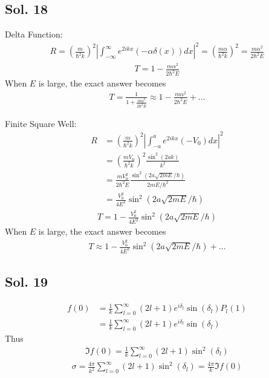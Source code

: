 \subsection*{Sol. 18}
Delta Function:
\begin{align*}
    R =
    \left(\frac{m}{\hbar^2k}\right)^2
    \left|
    \int_{-\infty}^\infty e^{2ikx}(-\alpha\delta(x))dx
    \right|^2 = \left(\frac{m\alpha}{\hbar^2k}\right)^2
    =\frac{m\alpha^2}{2\hbar^2 E}
\end{align*}
\begin{align*}
    T = 1-\frac{m\alpha^2}{2\hbar^2 E}
\end{align*}
When $E$ is large, the exact answer becomes
\begin{align*}
    T = \frac{1}{1+\frac{m\alpha^2}{2\hbar^2 E}}
    \approx 1 - \frac{m\alpha^2}{2\hbar^2 E}+\dots
\end{align*}


Finite Square Well:
\begin{align*}
    R & =
    \left(\frac{m}{\hbar^2k}\right)^2
    \left|
    \int_{-a}^a e^{2ikx}(-V_0)dx
    \right|^2 \\
      & =
    \left(\frac{m V_0}{\hbar^2k}\right)^2\frac{\sin^2(2ak)}{k^2} \\
      & =
    \frac{m V_0^2}{2\hbar^2 E}\frac{\sin^2(2a\sqrt{2mE}/\hbar)}{2mE/\hbar^2} \\
      & =
    \frac{V_0^2}{4 E^2}\sin^2(2a\sqrt{2mE}/\hbar)
\end{align*}
\begin{align*}
    T = 1 - \frac{V_0^2}{4 E^2}\sin^2(2a\sqrt{2mE}/\hbar)
\end{align*}
When $E$ is large, the exact answer becomes
\begin{align*}
    T
    \approx 1 - \frac{V_0^2}{4 E^2}\sin^2(2a\sqrt{2mE}/\hbar) + \dots
\end{align*}

\subsection*{Sol. 19}
\begin{align*}
    f(0) & = \frac{1}{k}\sum_{l=0}^\infty
    (2l+1)e^{i\delta_l}\sin(\delta_l)P_l(1) \\
         & =
    \frac{1}{k}\sum_{l=0}^\infty
    (2l+1)e^{i\delta_l}\sin(\delta_l)
\end{align*}
Thus
\begin{align*}
    \Im f(0) = \frac{1}{k}\sum_{l=0}^\infty
    (2l+1)\sin^2(\delta_l)
\end{align*}
\begin{align*}
    \sigma = \frac{4\pi}{k^2}\sum_{l=0}^\infty (2l+1)\sin^2(\delta_l)
    =\frac{4\pi}{k}\Im f(0)
\end{align*}

